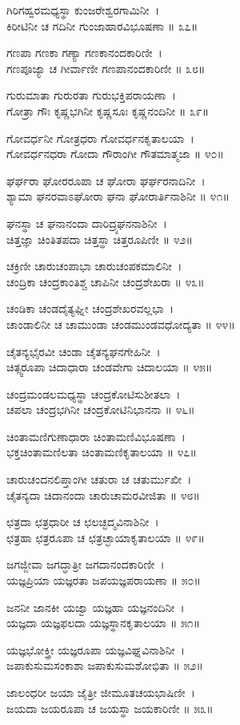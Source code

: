 ಗಿರಿಗಹ್ವರಮಧ್ಯಸ್ಥಾ ಕುಂಜರೇಶ್ವರಗಾಮಿನೀ~।\\
ಕಿರೀಟಿನೀ ಚ ಗದಿನೀ ಗುಂಜಾಹಾರವಿಭೂಷಣಾ ॥ ೩೭॥

ಗಣಪಾ ಗಣಕಾ ಗಣ್ಯಾ ಗಣಕಾನಂದಕಾರಿಣೀ~।\\
ಗಣಪೂಜ್ಯಾ ಚ ಗೀರ್ವಾಣೀ ಗಣಪಾನಂದಕಾರಿಣೀ ॥ ೩೮॥

ಗುರುಮಾತಾ ಗುರುರತಾ ಗುರುಭಕ್ತಿಪರಾಯಣಾ~।\\
ಗೋತ್ರಾ ಗೌಃ ಕೃಷ್ಣಭಗಿನೀ ಕೃಷ್ಣಸೂಃ ಕೃಷ್ಣನಂದಿನೀ ॥ ೩೯॥

ಗೋವರ್ಧನೀ ಗೋತ್ರಧರಾ ಗೋವರ್ಧನಕೃತಾಲಯಾ~।\\
ಗೋವರ್ಧನಧರಾ ಗೋದಾ ಗೌರಾಂಗೀ ಗೌತಮಾತ್ಮಜಾ ॥ ೪೦॥

ಘರ್ಘರಾ ಘೋರರೂಪಾ ಚ ಘೋರಾ ಘರ್ಘರನಾದಿನೀ~।\\
ಶ್ಯಾಮಾ ಘನರವಾಽಘೋರಾ ಘನಾ ಘೋರಾರ್ತಿನಾಶಿನೀ ॥ ೪೧॥

ಘನಸ್ಥಾ ಚ ಘನಾನಂದಾ ದಾರಿದ್ರ್ಯಘನನಾಶಿನೀ~।\\
ಚಿತ್ತಜ್ಞಾ ಚಿಂತಿತಪದಾ ಚಿತ್ತಸ್ಥಾ ಚಿತ್ತರೂಪಿಣೀ ॥ ೪೨॥

ಚಕ್ರಿಣೀ ಚಾರುಚಂಪಾಭಾ ಚಾರುಚಂಪಕಮಾಲಿನೀ~।\\
ಚಂದ್ರಿಕಾ ಚಂದ್ರಕಾಂತಿಶ್ಚ ಚಾಪಿನೀ ಚಂದ್ರಶೇಖರಾ ॥ ೪೩॥

ಚಂಡಿಕಾ ಚಂಡದೈತ್ಯಘ್ನೀ ಚಂದ್ರಶೇಖರವಲ್ಲಭಾ~।\\
ಚಾಂಡಾಲಿನೀ ಚ ಚಾಮುಂಡಾ ಚಂಡಮುಂಡವಧೋದ್ಯತಾ ॥ ೪೪॥

ಚೈತನ್ಯಭೈರವೀ ಚಂಡಾ ಚೈತನ್ಯಘನಗೇಹಿನೀ~।\\
ಚಿತ್ಸ್ವರೂಪಾ ಚಿದಾಧಾರಾ ಚಂಡವೇಗಾ ಚಿದಾಲಯಾ ॥ ೪೫॥

ಚಂದ್ರಮಂಡಲಮಧ್ಯಸ್ಥಾ ಚಂದ್ರಕೋಟಿಸುಶೀತಲಾ~।\\
ಚಪಲಾ ಚಂದ್ರಭಗಿನೀ ಚಂದ್ರಕೋಟಿನಿಭಾನನಾ ॥ ೪೬॥

ಚಿಂತಾಮಣಿಗುಣಾಧಾರಾ ಚಿಂತಾಮಣಿವಿಭೂಷಣಾ~।\\
ಭಕ್ತಚಿಂತಾಮಣಿಲತಾ ಚಿಂತಾಮಣಿಕೃತಾಲಯಾ ॥ ೪೭॥

ಚಾರುಚಂದನಲಿಪ್ತಾಂಗೀ ಚತುರಾ ಚ ಚತುರ್ಮುಖೀ~।\\
ಚೈತನ್ಯದಾ ಚಿದಾನಂದಾ ಚಾರುಚಾಮರವೀಜಿತಾ ॥ ೪೮॥

ಛತ್ರದಾ ಛತ್ರಧಾರೀ ಚ ಛಲಚ್ಛದ್ಮವಿನಾಶಿನೀ~।\\
ಛತ್ರಹಾ ಛತ್ರರೂಪಾ ಚ ಛತ್ರಚ್ಛಾಯಾಕೃತಾಲಯಾ ॥ ೪೯॥

ಜಗಜ್ಜೀವಾ ಜಗದ್ಧಾತ್ರೀ ಜಗದಾನಂದಕಾರಿಣೀ~।\\
ಯಜ್ಞಪ್ರಿಯಾ ಯಜ್ಞರತಾ ಜಪಯಜ್ಞಪರಾಯಣಾ ॥ ೫೦॥

ಜನನೀ ಜಾನಕೀ ಯಜ್ವಾ ಯಜ್ಞಹಾ ಯಜ್ಞನಂದಿನೀ~।\\
ಯಜ್ಞದಾ ಯಜ್ಞಫಲದಾ ಯಜ್ಞಸ್ಥಾನಕೃತಾಲಯಾ ॥ ೫೧॥

ಯಜ್ಞಭೋಕ್ತ್ರೀ ಯಜ್ಞರೂಪಾ ಯಜ್ಞವಿಘ್ನವಿನಾಶಿನೀ~।\\
ಜಪಾಕುಸುಮಸಂಕಾಶಾ ಜಪಾಕುಸುಮಶೋಭಿತಾ ॥ ೫೨॥

ಜಾಲಂಧರೀ ಜಯಾ ಜೈತ್ರೀ ಜೀಮೂತಚಯಭಾಷಿಣೀ~।\\
ಜಯದಾ ಜಯರೂಪಾ ಚ ಜಯಸ್ಥಾ ಜಯಕಾರಿಣೀ ॥ ೫೩॥

